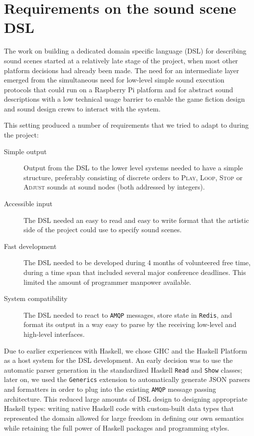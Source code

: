 \section{Requirements on the sound scene DSL}
\label{sec:requ-sound-spec}

The work on building a dedicated domain specific language
(DSL) for describing sound scenes
started at a relatively late stage of the project, when most other
platform decisions had already been made. The need for an intermediate
layer emerged from the simultaneous need for low-level simple sound
execution protocols that could run on a Raspberry Pi platform and for
abstract sound descriptions with a low technical usage barrier to
enable the game fiction design and sound design crews to interact with
the system.

This setting produced a number of requirements that we tried to adapt
to during the project:
\begin{description}
\item[Simple output] Output from the DSL to the lower level systems
  needed to have a simple structure, preferably consisting of discrete
  orders to \textsc{Play}, \textsc{Loop}, \textsc{Stop} or
  \textsc{Adjust} sounds at sound nodes (both addressed by integers).
\item[Accessible input] The DSL needed an easy to read and easy to
  write format that the artistic side of the project could use to
  specify sound scenes.
\item[Fast development] The DSL needed to be developed during 4 months
  of volunteered free time, during a time span that included several
  major conference deadlines. This limited the amount of programmer
  manpower available.
\item[System compatibility] The DSL needed to react to \texttt{AMQP} messages,
  store state in \texttt{Redis}, and format its output in a way easy to parse
  by the receiving low-level and high-level interfaces.
\end{description}

Due to earlier experiences with Haskell, we chose GHC and the Haskell
Platform as a host system for the DSL development. An early decision was
to use the automatic parser generation in the standardized Haskell
\texttt{Read} and \texttt{Show} classes; later on, we used the
\texttt{Generics} extension to automatically generate JSON parsers and
formatters in order to plug into the existing \texttt{AMQP} message
passing architecture. This reduced large amounts of DSL design to
designing appropriate Haskell types: writing native Haskell code with
custom-built data types that represented the domain allowed for large
freedom in defining our own semantics while retaining the full power
of Haskell packages and programming styles.


